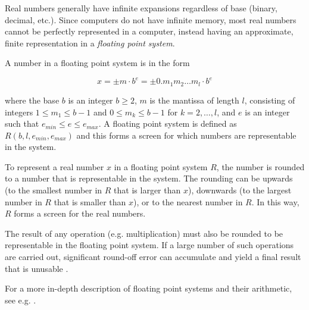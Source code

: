 \documentclass[../rigorous-computation.tex]{subfiles}
\begin{document}
  Real numbers generally have infinite expansions regardless of base (binary, decimal, etc.).
  Since computers do not have infinite memory, most real numbers cannot be perfectly represented in a computer, instead having an approximate, finite representation in a \textit{floating point system}.

  A number in a floating point system is in the form

  \begin{equation}
    x = \pm m \cdot b^e = \pm 0.m_1 m_2 \dots m_l \cdot b^e
  \end{equation}

  where the base $b$ is an integer $b \ge 2$, $m$ is the mantissa of length $l$, consisting of integers $1 \le m_1 \le b-1$ and $0 \le m_k \le b-1$ for $k = 2,\dots,l$, and $e$ is an integer such that $e_{min} \le e \le e_{max}$.
  A floating point system is defined as $R(b, l, e_{min}, e_{max})$ and this forms a screen for which numbers are representable in the system.

  To represent a real number $x$ in a floating point system $R$, the number is rounded to a number that is representable in the system.
  The rounding can be upwards (to the smallest number in $R$ that is larger than $x$), downwards (to the largest number in $R$ that is smaller than $x$), or to the nearest number in $R$. In this way, $R$ forms a screen for the real numbers. 

  The result of any operation (e.g. multiplication) must also be rounded to be representable in the floating point system.
  If a large number of such operations are carried out, significant round-off error can accumulate and yield a final result that is unusable \cite{sainudiin-phylo}.

  For a more in-depth description of floating point systems and their arithmetic, see e.g. \cite{toolbox-hammer}.

  
\end{document}
